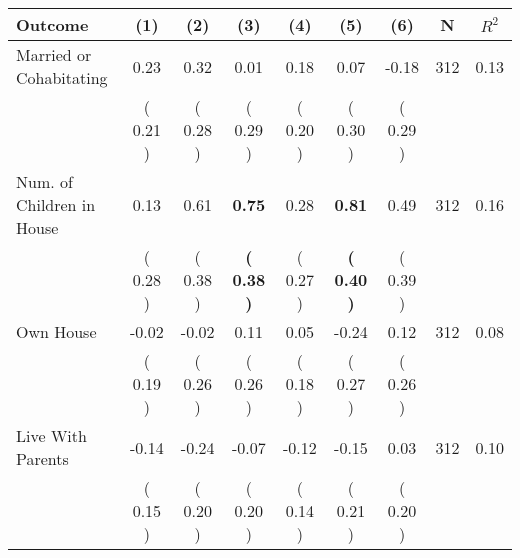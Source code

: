 \begin{tabular}{lcccccccc}
\toprule
 \textbf{Outcome} & \textbf{(1)} & \textbf{(2)} & \textbf{(3)} & \textbf{(4)} & \textbf{(5)} & \textbf{(6)} & \textbf{N} & \textbf{$ R^2$} \\
\midrule
Married or Cohabitating &      0.23 &      0.32 &      0.01 &      0.18 &      0.07 &     -0.18 & 312 &       0.13 \\ 
 & (     0.21 ) & (     0.28 ) & (     0.29 ) & (     0.20 ) & (     0.30 ) & (     0.29 ) & \\
Num. of Children in House &      0.13 &      0.61 & \textbf{     0.75} &      0.28 & \textbf{     0.81} &      0.49 & 312 &       0.16 \\ 
 & (     0.28 ) & (     0.38 ) & \textbf{(     0.38 )} & (     0.27 ) & \textbf{(     0.40 )} & (     0.39 ) & \\
Own House &     -0.02 &     -0.02 &      0.11 &      0.05 &     -0.24 &      0.12 & 312 &       0.08 \\ 
 & (     0.19 ) & (     0.26 ) & (     0.26 ) & (     0.18 ) & (     0.27 ) & (     0.26 ) & \\
Live With Parents &     -0.14 &     -0.24 &     -0.07 &     -0.12 &     -0.15 &      0.03 & 312 &       0.10 \\ 
 & (     0.15 ) & (     0.20 ) & (     0.20 ) & (     0.14 ) & (     0.21 ) & (     0.20 ) & \\
\bottomrule
\end{tabular}
